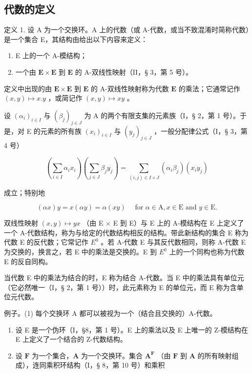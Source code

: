 \subsection{代数的定义}

定义 1. 设 A 为一个交换环。A 上的代数（或 A-代数，或当不致混淆时简称代数）是一个集合 E，其结构由给出以下内容来定义：

\begin{enumerate}
\def\labelenumi{(\arabic{enumi})}
\item
  E 上的一个 A-模结构；
\item
  一个由 \(\mathbf{E} \times \mathbf{E}\) 到 \(\mathbf{E}\) 的 A-双线性映射（II，§ 3，第 5 号）。
\end{enumerate}

定义中出现的由 \(\mathbf{E} \times \mathbf{E}\) 到 \(\mathbf{E}\) 的 A-双线性映射称为代数 \(\mathbf{E}\) 的乘法；它通常记作 \((x, y) \mapsto x.y\) ，或简记作 \((x, y) \mapsto xy\) 。

设 \((\alpha_{i})_{i\in I}\) 与 \((\beta_{j})_{j\in J}\) 为 A 的两个有限支集的元素族（I，§ 2，第 1 号）。于是，对 E 的元素的所有族 \((x_{i})_{i\in I}\) 与 \((y_{j})_{j\in J}\) ，一般分配律公式（I，§ 3，第 4 号）

\[
\left(\sum_ {i \in I} \alpha_ {i} x _ {i}\right) \left(\sum_ {j \in J} \beta_ {j} y _ {j}\right) = \sum_ {(i, j) \in I \times J} \left(\alpha_ {i} \beta_ {j}\right) \left(x _ {i} y _ {j}\right)\tag{1}
\]

成立；特别地

\[
(\alpha x) y = x (\alpha y) = \alpha (x y) \quad \text { for } \alpha \in \mathrm{A}, x \in \mathrm{E} \text { and } y \in \mathrm{E}.\tag{2}
\]

双线性映射 \((x,y)\mapsto yx\) （由 E × E 到 E）与 E 上的 A-模结构在 E 上定义了一个 A-代数结构，称为与给定的代数结构相反的结构。带此新结构的集合 E 称为代数 E 的反代数；它常记作 \(E^{0}\) 。若 A-代数 E 与其反代数相同，则称 A-代数 E 为交换的，换言之，若 E 中的乘法是交换的。E 到 \(E^{0}\) 上的一个同构也称为代数 E 的反自同构。

当代数 E 中的乘法为结合的时，E 称为结合 A-代数。当 E 中的乘法具有单位元（它必然唯一（I，§ 2，第 1 号））时，此元素称为 E 的单位元，而 E 称为含单位元代数。

例子。(1) 每个交换环 A 都可以被视为一个（结合且交换的）A-代数。

\begin{enumerate}
\def\labelenumi{(\arabic{enumi})}
\setcounter{enumi}{1}
\item
  设 E 是一个伪环（I，§8，第 1 号）。E 上的乘法以及 E 上唯一的 Z-模结构在 E 上定义了一个结合的 Z-代数结构。
\item
  设 \(\mathbf{F}\) 为一个集合，\(\mathbf{A}\) 为一个交换环。集合 \(\mathbf{A}^{\mathbf{F}}\) （由 \(\mathbf{F}\) 到 \(\mathbf{A}\) 的所有映射组成），连同乘积环结构（I，§ 8，第 10 号）和乘积
\end{enumerate}

